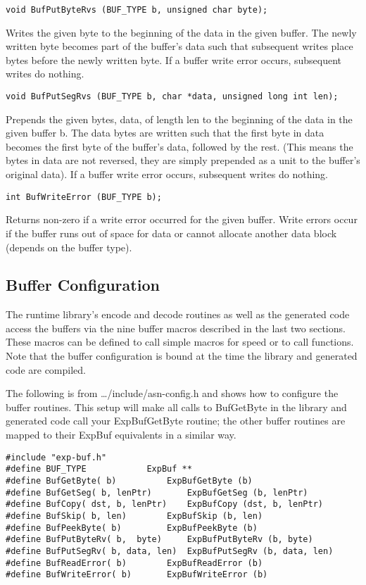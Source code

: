 \begin{verbatim}
void BufPutByteRvs (BUF_TYPE b, unsigned char byte);
\end{verbatim}
Writes the given byte to the beginning of the data in the given
buffer.  The newly written byte becomes part of the buffer's data such
that subsequent writes place bytes before the newly written byte.  If
a buffer write error occurs, subsequent writes do nothing.

\begin{verbatim}
void BufPutSegRvs (BUF_TYPE b, char *data, unsigned long int len);
\end{verbatim}
Prepends the given bytes, {\C data}, of length {\C len} to the
beginning of the data in the given buffer {\C b}.  The {\C data}
bytes are written such that the first byte in {\C data} becomes the
first byte of the buffer's data, followed by the rest. (This means the
bytes in {\C data} are not reversed, they are simply prepended as a
unit to the buffer's original data). If a buffer write error occurs,
subsequent writes do nothing.

\begin{verbatim}
int BufWriteError (BUF_TYPE b);
\end{verbatim}
Returns non-zero if a write error occurred for the given buffer.
Write errors occur if the buffer runs out of space for data or cannot
allocate another data block (depends on the buffer type).

\subsection{Buffer Configuration}

The runtime library's encode and decode routines as well as the
generated code access the buffers via the nine buffer macros
described in the last two sections.  These macros can be defined to
call simple macros for speed or to call functions.  Note that the
buffer configuration is bound at the time the library and generated
code are compiled.

The following is from {\ufn \dots/include/asn-config.h} and shows how to
configure the buffer routines.  This setup will make all calls to
{\C BufGetByte} in the library and  generated code call your
{\C ExpBufGetByte} routine; the other buffer routines are mapped to
their {\C ExpBuf} equivalents in a similar way.

\begin{verbatim}
#include "exp-buf.h"
#define BUF_TYPE			ExpBuf **
#define BufGetByte( b)			ExpBufGetByte (b)
#define BufGetSeg( b, lenPtr)		ExpBufGetSeg (b, lenPtr)
#define BufCopy( dst, b, lenPtr)	ExpBufCopy (dst, b, lenPtr)
#define BufSkip( b, len)		ExpBufSkip (b, len)
#define BufPeekByte( b)			ExpBufPeekByte (b)
#define BufPutByteRv( b,  byte)		ExpBufPutByteRv (b, byte)
#define BufPutSegRv( b, data, len)	ExpBufPutSegRv (b, data, len)
#define BufReadError( b)		ExpBufReadError (b)
#define BufWriteError( b)		ExpBufWriteError (b)
\end{verbatim}

